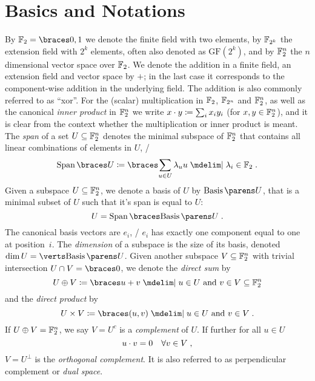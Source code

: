 \section{Basics and Notations}
By $\F_2 = \set{0,1}$ we denote the finite field with two elements, by $\mathbb{F}_{2^k}$ the extension field with $2^k$ elements, often also denoted as $\mathrm{GF}(2^k)$, and by $\mathbb{F}_2^n$ the $n$ dimensional vector space over $\mathbb{F}_2$.
We denote the addition in a finite field, an extension field and vector space by $+$; in the last case it corresponds to the component-wise addition in the underlying field.
The addition is also commonly referred to as \enquote{xor}.
For the (scalar) multiplication in $\mathbb{F}_2$, $\mathbb{F}_{2^n}$ and $\mathbb{F}_2^n$, as well as the canonical \emph{inner product} in $\mathbb{F}_2^n$ we write $x \cdot y \coloneqq \sum_i x_i y_i$ (for $x,y \in \mathbb{F}_2^n$), and it is clear from the context whether the multiplication or inner product is meant.
The \emph{span} of a set $U \subseteq \mathbb{F}_2^n$ denotes the minimal subspace of $\mathbb{F}_2^n$ that contains all linear combinations of elements in $U$, \ie/
\begin{equation*}
    \Span{U} \coloneqq \set{\sum_{u \in U} \lambda_u u \given \lambda_i \in \F_2}\;.
\end{equation*}
Given a subspace $U \subseteq \mathbb{F}_2^n$, we denote a basis of $U$ by $\Basis{U}$, that is a minimal subset of $U$ such that it's span is equal to $U$:
\begin{equation*}
    U = \Span{\Basis{U}}\;.
\end{equation*}
The canonical basis vectors are $e_i$, \ie/ $e_i$ has exactly one component equal to one at position~$i$.
The \emph{dimension} of a subspace is the size of its basis, denoted $\dim{U} = \abs{\Basis{U}}$.
Given another subspace $V \subseteq \mathbb{F}_2^n$ with trivial intersection $U \cap V = \set{0}$, we denote the \emph{direct sum} by
\begin{equation*}
    U \oplus V \coloneqq \set{u + v \given u \in U\ \text{and}\ v \in V} \subseteq \F_2^n
\end{equation*}
and the \emph{direct product} by
\begin{equation*}
    U \times V \coloneqq \set{(u, v) \given u \in U\ \text{and}\ v \in V}\;.
\end{equation*}
If $U \oplus V = \mathbb{F}_2^n$, we say $V = U^c$ is a \emph{complement} of $U$.
If further for all $u \in U$
\begin{equation*}
    u \cdot v = 0 \quad \forall v \in V\;,
\end{equation*}
$V = U^\bot$ is the \emph{orthogonal complement}.
It is also referred to as perpendicular complement or \emph{dual space}.


